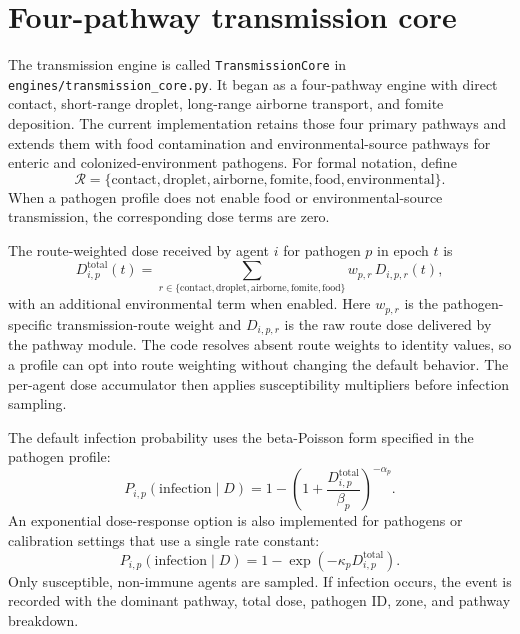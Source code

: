 \section{Four-pathway transmission core}
The transmission engine is called \texttt{TransmissionCore} in \texttt{engines/}\allowbreak\texttt{transmission\_core.py}. It began as a four-pathway engine with direct contact, short-range droplet, long-range
airborne transport, and fomite deposition. The current implementation retains those four primary pathways and extends them with food contamination and environmental-source pathways for
enteric and colonized-environment pathogens. For formal notation, define
\begin{equation}
\mathcal{R}=\{\mathrm{contact},\mathrm{droplet},\mathrm{airborne},\mathrm{fomite},\mathrm{food},
\mathrm{environmental}\}.
\end{equation}
When a pathogen profile does not enable food or environmental-source transmission, the corresponding dose terms are zero.

The route-weighted dose received by agent $i$ for pathogen $p$ in epoch $t$ is
\begin{equation}
D_{i,p}^{\mathrm{total}}(t)=\sum_{r\in\{\mathrm{contact},\mathrm{droplet},\mathrm{airborne},\mathrm{fomite},\mathrm{food}\}}
w_{p,r}\,D_{i,p,r}(t),
\label{eq:route-weighted-dose}
\end{equation}
with an additional environmental term when enabled. Here $w_{p,r}$ is the pathogen-specific transmission-route weight and $D_{i,p,r}$ is the raw route dose delivered by the pathway module.
The code resolves absent route weights to identity values, so a profile can opt into route weighting without changing the default behavior. The per-agent dose accumulator then applies
susceptibility multipliers before infection sampling.

The default infection probability uses the beta-Poisson form specified in the pathogen profile:
\begin{equation}
P_{i,p}(\mathrm{infection}\mid D)=1-\left(1+\frac{D_{i,p}^{\mathrm{total}}}{\beta_p}\right)^{-\alpha_p}.
\label{eq:beta-poisson}
\end{equation}
An exponential dose-response option is also implemented for pathogens or calibration settings that use a single rate constant:
\begin{equation}
P_{i,p}(\mathrm{infection}\mid D)=1-\exp(-\kappa_p D_{i,p}^{\mathrm{total}}).
\end{equation}
Only susceptible, non-immune agents are sampled. If infection occurs, the event is recorded with the dominant pathway, total dose, pathogen ID, zone, and pathway breakdown.

